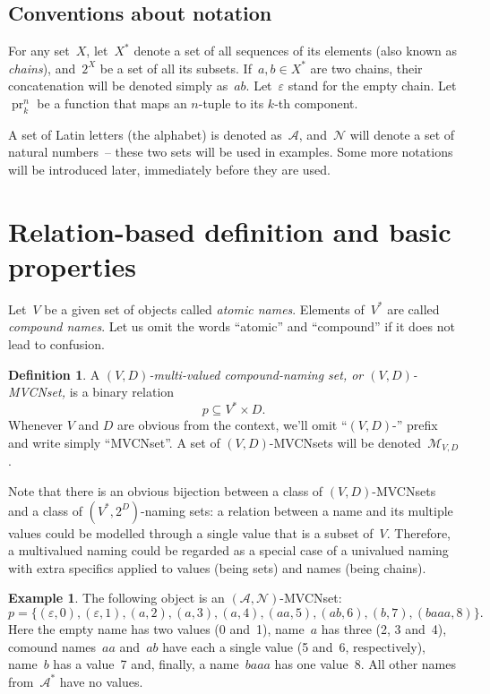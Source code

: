 \documentclass{article}
\theoremstyle{definition}
\newtheorem{Df}{Definition}
\newtheorem{Ex}{Example}
\newcommand{\setcharmvcn}{M}
\newcommand{\setsymbol}[3]{\mathcal{#1}_{#2,#3}}
\newcommand{\setmvcn}[2]{\setsymbol{\setcharmvcn}{#1}{#2}}
\newcommand{\seta}{\mathcal{A}}
\newcommand{\setn}{\mathcal{N}}
\newcommand{\proj}[2]{\operatorname{pr}^{#1}_{#2}}
\begin{document}
\subsection*{Conventions about notation}

For any set~$X$, let~$X^\ast$ denote a set of all sequences of its elements
(also known as \emph{chains}), and~$2^X$ be a set of all its subsets.
If~$a,b\in X^\ast$ are two chains, their concatenation will be denoted simply
as~$ab$. Let~$\varepsilon$ stand for the empty chain.
Let $\proj{n}{k}$ be a function that maps an $n$-tuple to its $k$-th component.

A set of Latin letters (the alphabet) is denoted as~$\seta$,
and~$\setn$ will denote a set of natural numbers~-- these two sets will be
used in examples.
Some more notations will be introduced later, immediately before they are used.



\section{Relation-based definition and basic properties}

Let~$V$ be a given set of objects called \emph{atomic names}. Elements
of~$V^\ast$ are called \emph{compound names}. Let us omit the words ``atomic''
and ``compound'' if it does not lead to confusion.

\begin{Df}\label{df:mvcn}
A \emph{$(V,D)$-multi-valued compound-naming set, or $(V,D)$-MVCNset,} is a binary
relation
\[
  p \subseteq V^\ast \times D .
\]
Whenever $V$ and $D$ are obvious from the context, we'll omit ``$(V,D)$-''
prefix and write simply ``MVCNset''. A set of $(V,D)$-MVCNsets will be
denoted~$\setmvcn{V}{D}$.
\end{Df}

Note that there is an obvious bijection between a class of $(V,D)$-MVCNsets and
a class of $(V^\ast, 2^D)$-naming sets: a relation between a name and its
multiple values could be modelled through a single value that is a subset
of~$V$. Therefore, a multivalued naming could be regarded as a special case of
a univalued naming with extra specifics applied to values (being sets) and names
(being chains).

\begin{Ex}\label{ex:mvcn}
The following object is an $(\seta, \setn)$-MVCNset:
\[
  p = \{
    (\varepsilon, 0),
    (\varepsilon, 1),
    (a,           2),
    (a,           3),
    (a,           4),
    (aa,          5),
    (ab,          6),
    (b,           7),
    (baaa,        8)
  \} .
\]
Here the empty name has two values (0 and~1), name~$a$ has three (2, 3 and~4),
comound names~$aa$ and~$ab$ have each a single value (5 and~6, respectively),
name~$b$ has a value~7 and, finally, a name~$baaa$ has one value~8. All other
names from~$\seta^\ast$ have no values.
\end{Ex}
\end{document}
